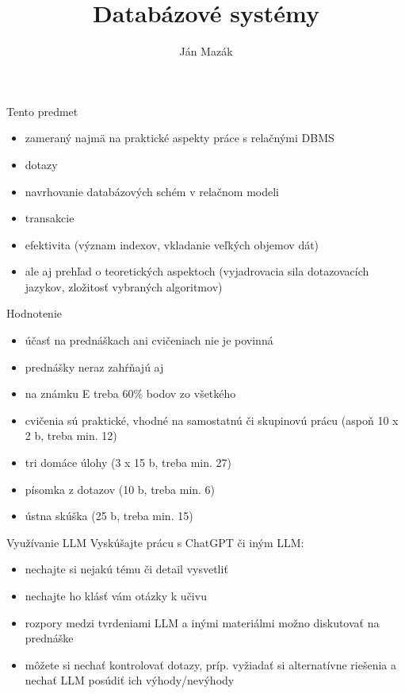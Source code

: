 \documentclass[12pt]{beamer}
\title{Databázové systémy}
\author{Ján Mazák}
\institute{FMFI UK Bratislava}
\date{}
\begin{document}
\frame{\titlepage}

\begin{frame}{Tento predmet}
\begin{itemize}
\item zameraný najmä na praktické aspekty práce s relačnými DBMS
\item dotazy
\item navrhovanie databázových schém v relačnom modeli
\item transakcie
\item efektivita (význam indexov, vkladanie veľkých objemov dát)
\pause
\item ale aj prehľad o teoretických aspektoch (vyjadrovacia sila dotazovacích jazykov, zložitosť vybraných algoritmov)
\end{itemize}
\end{frame}

\begin{frame}{Hodnotenie}
\begin{itemize}
\item účasť na prednáškach ani cvičeniach nie je povinná
\item prednášky neraz zahŕňajú aj 
\pause
\item na známku E treba 60\% bodov zo všetkého
\item cvičenia sú praktické, vhodné na samostatnú či skupinovú prácu
    (aspoň 10 x 2 b, treba min. 12)
\item tri domáce úlohy (3 x 15 b, treba min. 27)
\item písomka z dotazov (10 b, treba min. 6)
\item ústna skúška (25 b, treba min. 15)
\end{itemize}
\end{frame}

\begin{frame}{Využívanie LLM}
Vyskúšajte prácu s ChatGPT či iným LLM:
\begin{itemize}
\item nechajte si nejakú tému či detail vysvetliť
\item nechajte ho klásť vám otázky k učivu
\item rozpory medzi tvrdeniami LLM a inými materiálmi možno diskutovať na prednáške
\pause
\item môžete si nechať kontrolovať dotazy, príp. vyžiadať si alternatívne riešenia a nechať LLM posúdiť ich výhody/nevýhody
\end{itemize}
\end{frame}
\end{document}
